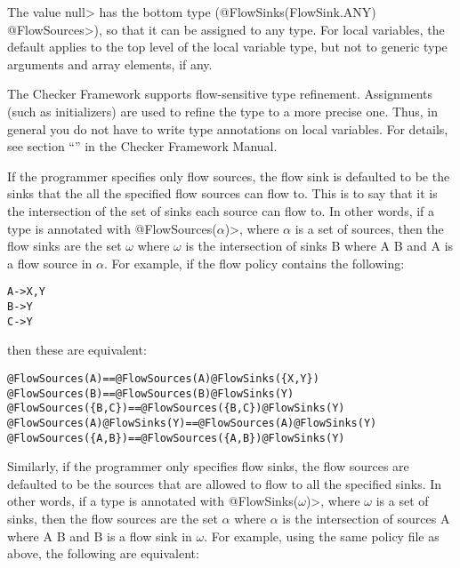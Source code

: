 The value \<null> has the bottom type (\<@FlowSinks(FlowSink.ANY)
@FlowSources>),
so that it can be assigned to any type. For local variables, the
default applies to the top level of the local variable type, but not
to generic type arguments and array elements, if any.

The Checker Framework supports flow-sensitive type refinement.  Assignments (such as
initializers) are used to refine the type to a more precise one.  Thus, in
general you do not have to write type annotations on local variables.  For
details, see section ``'' in the Checker Framework Manual.

If the programmer specifies only flow sources, the flow sink is defaulted
to be the
sinks that the all the specified flow sources can flow to. This is to say that 
it is the intersection of the set of sinks each source can flow to.
 In other words, if a type is annotated with 
\<@FlowSources($\alpha$)>, where $\alpha$ is a set of sources, then the flow sinks are the set 
$\omega$ where $\omega$ is the intersection of sinks B where A \flowsto{} B and A is a flow source in 
$\alpha$.  For example, if the flow policy contains the following:

\begin{alltt}
  A -> X,Y
  B -> Y
  C -> Y
\end{alltt}
  
\noindent 
then these are equivalent:

\begin{alltt}
  @FlowSources(A)                 ==   @FlowSources(A) @FlowSinks(\{X, Y\})
  @FlowSources(B)                 ==   @FlowSources(B) @FlowSinks(Y)
  @FlowSources(\{B,C\})             ==   @FlowSources(\{B,C\}) @FlowSinks(Y)
  @FlowSources(A) @FlowSinks(Y)   ==   @FlowSources(A) @FlowSinks(Y) 
  @FlowSources(\{A,B\})             ==   @FlowSources(\{A,B\}) @FlowSinks(Y)
\end{alltt}


Similarly, if the programmer only specifies flow sinks, the flow sources are defaulted to be the sources 
that are allowed to flow to all the specified sinks.  In other words, if a type is annotated with 
\<@FlowSinks($\omega$)>, where $\omega$ is a set of sinks, then the flow sources are the set 
$\alpha$ where $\alpha$ is the intersection of sources A where A \flowsto{} B and B is a flow sink in 
$\omega$. For example, using the same policy file as above, the following are equivalent:

